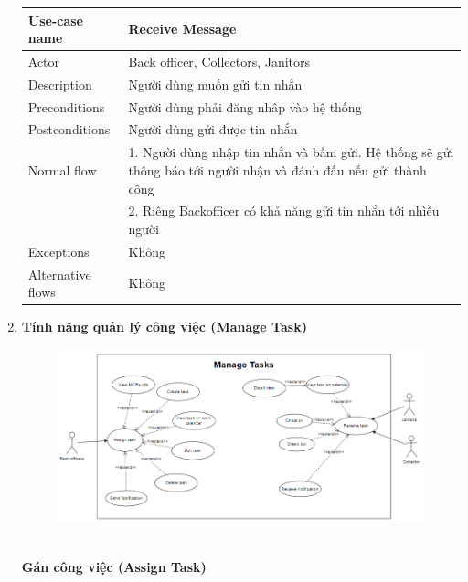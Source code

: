 \documentclass[a4paper]{article}
\begin{document}
\begin{enumerate}
\begin{tabular}{|p{3cm}|p{10cm}|}
     Use-case name & Receive Message \\
     \hline
     Actor & Back officer, Collectors, Janitors\\
     \hline
     Description & Người dùng muốn gửi tin nhắn \\
     \hline
     Preconditions & Người dùng phải đăng nhâp vào hệ thống\\
          \hline
     Postconditions & Người dùng gửi được tin nhắn \\
     \hline
     Normal flow & 1. Người dùng nhập tin nhắn và bấm gửi. Hệ thống sẽ gửi thông báo tới người nhận và đánh đấu nếu gửi thành công \\
     & 2. Riêng Backofficer có khả năng gửi tin nhắn tới nhìều người \\
     \hline
     Exceptions & Không\\
     \hline
     Alternative flows & Không\\
     \hline
\end{tabular}
\vspace{0.5cm}

\item \textbf{Tính năng quản lý công việc (Manage Task)}\\
\begin{figure}[!h]
    \begin{center}
      \includegraphics[width=6in]{Image/manage.png}
    \end{center}
\end{figure}
\\

\textbf{Gán công việc (Assign Task)} \\
\begin{tabular}{|p{3cm}|p{10cm}|}
     \hline
     

\end{tabular}
\end{enumerate}
\end{document}
